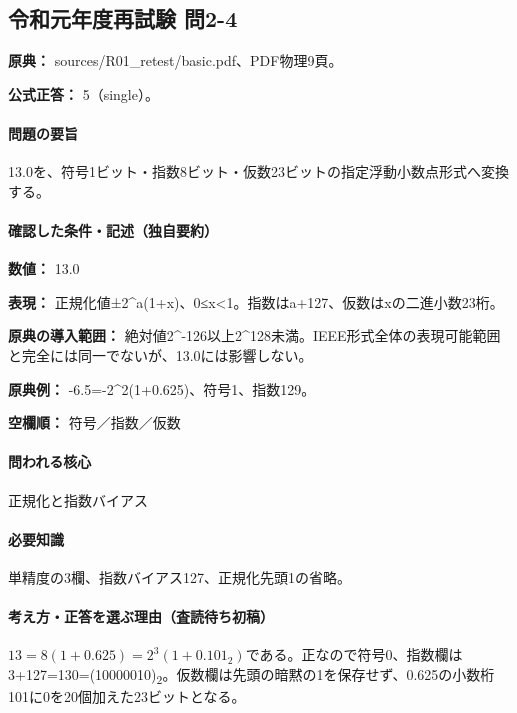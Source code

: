 \subsection{令和元年度再試験 問2-4}
\label{q:r01-ret-basic-2-4}

\noindent\textbf{原典：} sources/R01\_retest/basic.pdf、PDF物理9頁。

\textbf{公式正答：} 5（single）。

\paragraph{問題の要旨} 13.0を、符号1ビット・指数8ビット・仮数23ビットの指定浮動小数点形式へ変換する。

\paragraph{確認した条件・記述（独自要約）}\mbox{}\par

\noindent\textbf{数値：} 13.0\par

\noindent\textbf{表現：} 正規化値±2\textasciicircum{}a(1+x)、0≤x<1。指数はa+127、仮数はxの二進小数23桁。\par

\noindent\textbf{原典の導入範囲：} 絶対値2\textasciicircum{}-126以上2\textasciicircum{}128未満。IEEE形式全体の表現可能範囲と完全には同一でないが、13.0には影響しない。\par

\noindent\textbf{原典例：} -6.5=-2\textasciicircum{}2(1+0.625)、符号1、指数129。\par

\noindent\textbf{空欄順：} 符号／指数／仮数\par

\paragraph{問われる核心} 正規化と指数バイアス

\paragraph{必要知識} 単精度の3欄、指数バイアス127、正規化先頭1の省略。

\paragraph{考え方・正答を選ぶ理由（査読待ち初稿）} \(13=8(1+0.625)=2^3(1+0.101_2)\)である。正なので符号0、指数欄は3+127=\allowbreak{}130=\allowbreak{}(10000010)\textsubscript{2}。仮数欄は先頭の暗黙の1を保存せず、0.625の小数桁101に0を20個加えた23ビットとなる。

